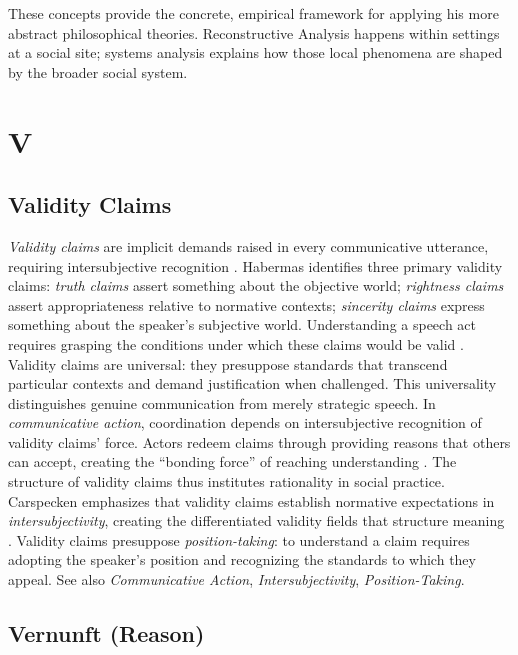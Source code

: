 \documentclass{book}
\begin{document}
These concepts provide the concrete, empirical framework for applying his more abstract philosophical theories. Reconstructive Analysis happens within settings at a social site; systems analysis explains how those local phenomena are shaped by the broader social system.

\parencite{Carspecken1995aa}

\chapter{V}

\section{Validity Claims}

\textit{Validity claims} are implicit demands raised in every communicative utterance, requiring intersubjective recognition \parencite{Habermas1984, Carspecken1999}. Habermas identifies three primary validity claims: \textit{truth claims} assert something about the objective world; \textit{rightness claims} assert appropriateness relative to normative contexts; \textit{sincerity claims} express something about the speaker's subjective world. Understanding a speech act requires grasping the conditions under which these claims would be valid \parencite{Carspecken1999}. Validity claims are universal: they presuppose standards that transcend particular contexts and demand justification when challenged. This universality distinguishes genuine communication from merely strategic speech. In \textit{communicative action}, coordination depends on intersubjective recognition of validity claims' force. Actors redeem claims through providing reasons that others can accept, creating the ``bonding force'' of reaching understanding \parencite{habermas1992individuation}. The structure of validity claims thus institutes rationality in social practice. Carspecken emphasizes that validity claims establish normative expectations in \textit{intersubjectivity}, creating the differentiated validity fields that structure meaning \parencite{Carspecken1999}. Validity claims presuppose \textit{position-taking}: to understand a claim requires adopting the speaker's position and recognizing the standards to which they appeal. See also \textit{Communicative Action}, \textit{Intersubjectivity}, \textit{Position-Taking}.

\section{Vernunft (Reason)}
\end{document}
